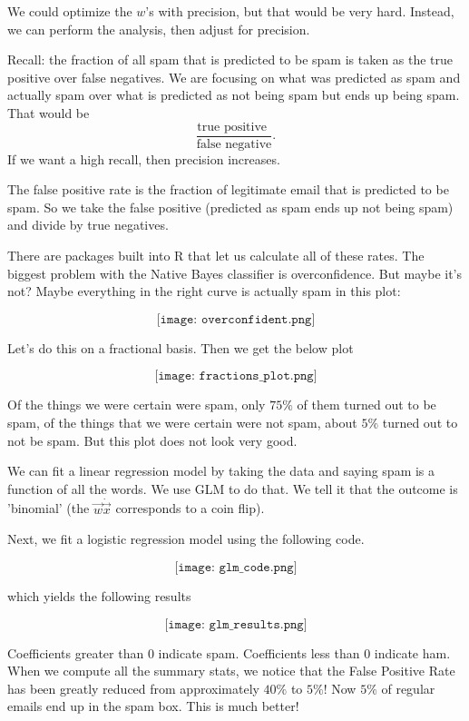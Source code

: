 We could optimize the $w$'s with precision, but that would be very hard. Instead, we can perform the analysis, then adjust for precision.

Recall: the fraction of all spam that is predicted to be spam is taken as the true positive over false negatives. We are focusing on what was predicted as spam and actually spam over what is predicted as not being spam but ends up being spam. That would be $$\frac{\text{true positive }}{\text{false negative}}.$$ If we want a high recall, then precision increases. 

The false positive rate is the fraction of legitimate email that is predicted to be spam. So we take the false positive (predicted as spam ends up not being spam) and divide by true negatives. 

There are packages built into R that let us calculate all of these rates. The biggest problem with the Native Bayes classifier is overconfidence. But maybe it's not? Maybe everything in the right curve is actually spam in this plot:

$$\texttt{[image: overconfident.png]}$$

Let's do this on a fractional basis. Then we get the below plot

$$\texttt{[image: fractions\_plot.png]}$$

Of the things we were certain were spam, only $75\%$ of them turned out to be spam, of the things that we were certain were not spam, about $5\%$ turned out to not be spam. But this plot does not look very good. 

We can fit a linear regression model by taking the data and saying spam is a function of all the words. We use GLM to do that. We tell it that the outcome is 'binomial' (the $\vec{w} \dot \vec{x}$ corresponds to a coin flip). 

Next, we fit a logistic regression model using the following code. 

$$\texttt{[image: glm\_code.png]}$$

which yields the following results

$$\texttt{[image: glm\_results.png]}$$

Coefficients greater than $0$ indicate spam. Coefficients less than $0$ indicate ham. When we compute all the summary stats, we notice that the False Positive Rate has been greatly reduced from approximately $40\%$ to $5\%$! Now $5\%$ of regular emails end up in the spam box. This is much better! 


